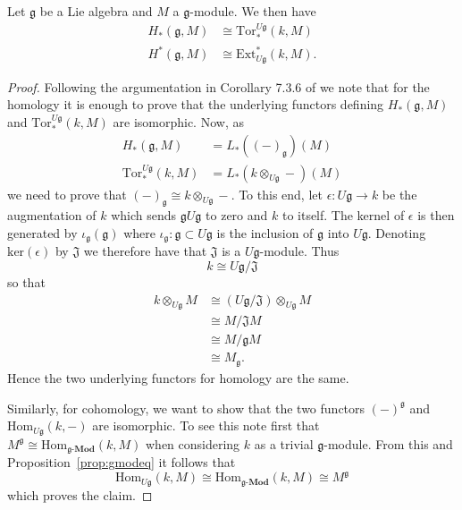 \begin{proposition}
  Let $ \mathfrak{g} $ be a Lie algebra and $ M $ a $ \mathfrak{g} $-module. We then have
  \begin{align*}
    H_*(\mathfrak{g}, M) &\cong \text{Tor}^{U\mathfrak{g}}_*(k, M) \\
    H^*(\mathfrak{g}, M) &\cong \text{Ext}^*_{U\mathfrak{g}}(k, M)
  .\end{align*}
\end{proposition}
\begin{proof}
  Following the argumentation in Corollary 7.3.6 of \cite{weibel1994homological} we note that for the homology it is enough to prove that the underlying functors defining $ H_*(\mathfrak{g}, M) $ and $ \text{Tor}_*^{U\mathfrak{g}}(k, M) $ are isomorphic. Now, as
  \begin{align*}
    H_*(\mathfrak{g}, M) &= L_*((-)_\mathfrak{g})(M) \\
    \text{Tor}_*^{U\mathfrak{g}}(k, M) &= L_*(k \otimes_{U\mathfrak{g}} -)(M)
  \end{align*}
  we need to prove that $ (-)_\mathfrak{g} \cong k \otimes_{U\mathfrak{g}} - $. To this end, let $ \epsilon: U\mathfrak{g} \to k $ be the augmentation of $ k $ which sends $ \mathfrak{g}U\mathfrak{g} $ to zero and $ k $ to itself. The kernel of $ \epsilon $ is then generated by $ \iota_\mathfrak{g}(\mathfrak{g}) $ where $ \iota_\mathfrak{g}: \mathfrak{g} \subset U\mathfrak{g} $ is the inclusion of $ \mathfrak{g} $ into $ U\mathfrak{g} $. Denoting $ \text{ker}(\epsilon) $ by $ \mathfrak{J} $ we therefore have that $ \mathfrak{J} $ is a $ U\mathfrak{g} $-module. Thus
  \begin{equation}
    k \cong U\mathfrak{g}/\mathfrak{J}
  \end{equation}
  so that
  \begin{align*}
    k \otimes_{U\mathfrak{g}} M &\cong (U\mathfrak{g}/\mathfrak{J}) \otimes_{U\mathfrak{g}} M \\
                                &\cong M/\mathfrak{J}M \\
                                &\cong M/\mathfrak{g}M \\
                                &\cong M_\mathfrak{g}
  .\end{align*}
  Hence the two underlying functors for homology are the same.

  Similarly, for cohomology, we want to show that the two functors $ (-)^\mathfrak{g} $ and $ \text{Hom}_{U\mathfrak{g}}(k, -) $ are isomorphic. To see this note first that $ M^\mathfrak{g} \cong \text{Hom}_{\mathfrak{g}\text{-}\mathbf{Mod}}(k, M) $ when considering $ k $ as a trivial $ \mathfrak{g} $-module. From this and Proposition~\ref{prop:gmodeq} it follows that
  \begin{equation}
    \text{Hom}_{U\mathfrak{g}}(k, M) \cong \text{Hom}_{\mathfrak{g}\text{-}\mathbf{Mod}}(k, M) \cong M^{\mathfrak{g}}
    \label{eq:cohomsame}
  \end{equation}
  which proves the claim.
\end{proof}

